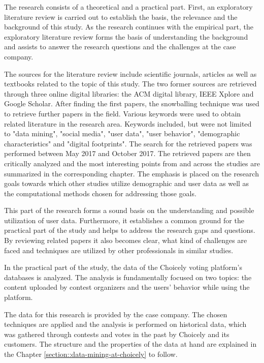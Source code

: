 The research consists of a theoretical and a practical part. First, an exploratory literature review is carried out to establish the basis, the relevance and the background of this study. As the research continues with the empirical part, the exploratory literature review forms the basis of understanding the background and assists to answer the research questions and the challenges at the case company. 

The sources for the literature review include scientific journals, articles as well as textbooks related to the topic of this study. The two former sources are retrieved through three online digital libraries: the ACM digital library, IEEE Xplore and Google Scholar. After finding the first papers, the snowballing technique was used to retrieve further papers in the field. Various keywords were used to obtain related literature in the research area. Keywords included, but were not limited to "data mining", "social media", "user data", "user behavior", "demographic characteristics" and "digital footprints". The search for the retrieved papers was performed between May 2017 and October 2017. The retrieved papers are then critically analyzed and the most interesting points from and across the studies are summarized in the corresponding chapter. The emphasis is placed on the research goals towards which other studies utilize demographic and user data as well as the computational methods chosen for addressing those goals. 

This part of the research forms a sound basis on the understanding and possible utilization of user data. Furthermore, it establishes a common ground for the practical part of the study and helps to address the research gaps and questions. By reviewing related papers it also becomes clear, what kind of challenges are faced and techniques are utilized by other professionals in similar studies.

In the practical part of the study, the data of the Choicely voting platform's databases is analyzed. The analysis is fundamentally focused on two topics: the content uploaded by contest organizers and the users' behavior while using the platform. 

The data for this research is provided by the case company. The chosen techniques are applied and the analysis is performed on historical data, which was gathered through contests and votes in the past by Choicely and its customers. The structure and the properties of the data at hand are explained in the Chapter \ref{section::data-mining-at-choicely} to follow. 

